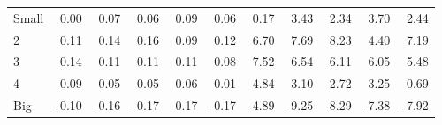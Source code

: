 \begin{table}[!ht]
\begin{tabular}{lrrrrrrrrrr}
    \\
      \cmidrule(r){2-6} \cmidrule(r){7-11}

    Small   & 0.00  & 0.07  & 0.06  & 0.09  & 0.06  & 0.17  & 3.43  & 2.34  & 3.70  & 2.44  \\
         2  & 0.11  & 0.14  & 0.16  & 0.09  & 0.12  & 6.70  & 7.69  & 8.23  & 4.40  & 7.19  \\
         3  & 0.14  & 0.11  & 0.11  & 0.11  & 0.08  & 7.52  & 6.54  & 6.11  & 6.05  & 5.48  \\
         4  & 0.09  & 0.05  & 0.05  & 0.06  & 0.01  & 4.84  & 3.10  & 2.72  & 3.25  & 0.69  \\
    Big     & -0.10  & -0.16  & -0.17  & -0.17  & -0.17  & -4.89  & -9.25  & -8.29  & -7.38  & -7.92  \\

  

  \bottomrule
\end{tabular}
\label{tbl:25_Size_BM_C1997b}
\end{table}